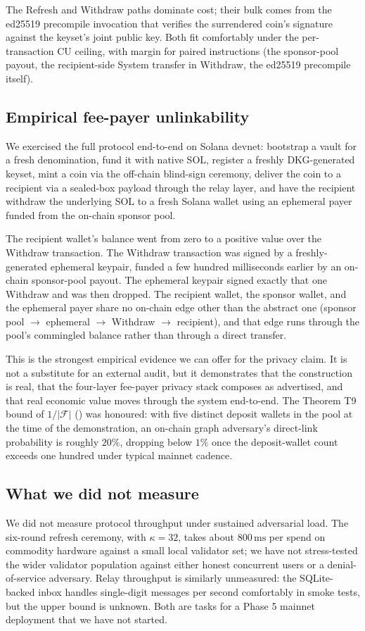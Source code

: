 The Refresh and Withdraw paths dominate cost; their bulk comes from the ed25519 precompile invocation that verifies the surrendered coin's signature against the keyset's joint public key. Both fit comfortably under the per-transaction CU ceiling, with margin for paired instructions (the sponsor-pool payout, the recipient-side System transfer in Withdraw, the ed25519 precompile itself).

\subsection{Empirical fee-payer unlinkability}
\label{sec:eval-loop}

We exercised the full protocol end-to-end on Solana devnet: bootstrap a vault for a fresh denomination, fund it with native SOL, register a freshly DKG-generated keyset, mint a coin via the off-chain blind-sign ceremony, deliver the coin to a recipient via a sealed-box payload through the relay layer, and have the recipient withdraw the underlying SOL to a fresh Solana wallet using an ephemeral payer funded from the on-chain sponsor pool.

The recipient wallet's balance went from zero to a positive value over the Withdraw transaction. The Withdraw transaction was signed by a freshly-generated ephemeral keypair, funded a few hundred milliseconds earlier by an on-chain sponsor-pool payout. The ephemeral keypair signed exactly that one Withdraw and was then dropped. The recipient wallet, the sponsor wallet, and the ephemeral payer share no on-chain edge other than the abstract one (sponsor pool $\to$ ephemeral $\to$ Withdraw $\to$ recipient), and that edge runs through the pool's commingled balance rather than through a direct transfer.

This is the strongest empirical evidence we can offer for the privacy claim. It is not a substitute for an external audit, but it demonstrates that the construction is real, that the four-layer fee-payer privacy stack composes as advertised, and that real economic value moves through the system end-to-end. The Theorem T9 bound of $1/|\mathcal{F}|$ () was honoured: with five distinct deposit wallets in the pool at the time of the demonstration, an on-chain graph adversary's direct-link probability is roughly $20\%$, dropping below $1\%$ once the deposit-wallet count exceeds one hundred under typical mainnet cadence.

\subsection{What we did not measure}

We did not measure protocol throughput under sustained adversarial load. The six-round refresh ceremony, with $\kappa = 32$, takes about $800\,\text{ms}$ per spend on commodity hardware against a small local validator set; we have not stress-tested the wider validator population against either honest concurrent users or a denial-of-service adversary. Relay throughput is similarly unmeasured: the SQLite-backed inbox handles single-digit messages per second comfortably in smoke tests, but the upper bound is unknown. Both are tasks for a Phase 5 mainnet deployment that we have not started.
